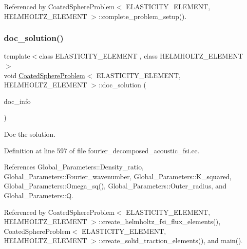 Referenced by Coated\+Sphere\+Problem$<$ E\+L\+A\+S\+T\+I\+C\+I\+T\+Y\+\_\+\+E\+L\+E\+M\+E\+N\+T, H\+E\+L\+M\+H\+O\+L\+T\+Z\+\_\+\+E\+L\+E\+M\+E\+N\+T $>$\+::complete\+\_\+problem\+\_\+setup().

\mbox{\label{classCoatedSphereProblem_aaeade2a110160c002b2b45954a5a0edc}} 
\subsubsection{\texorpdfstring{doc\+\_\+solution()}{doc\_solution()}\hspace{0.1cm}{\footnotesize\ttfamily [1/2]}}
{\footnotesize\ttfamily template$<$class E\+L\+A\+S\+T\+I\+C\+I\+T\+Y\+\_\+\+E\+L\+E\+M\+E\+NT , class H\+E\+L\+M\+H\+O\+L\+T\+Z\+\_\+\+E\+L\+E\+M\+E\+NT $>$ \\
void \hyperlink{classCoatedSphereProblem}{Coated\+Sphere\+Problem}$<$ E\+L\+A\+S\+T\+I\+C\+I\+T\+Y\+\_\+\+E\+L\+E\+M\+E\+NT, H\+E\+L\+M\+H\+O\+L\+T\+Z\+\_\+\+E\+L\+E\+M\+E\+NT $>$\+::doc\+\_\+solution (\begin{DoxyParamCaption}\item[{Doc\+Info \&}]{doc\+\_\+info }\end{DoxyParamCaption})}



Doc the solution. 



Definition at line 597 of file fourier\+\_\+decomposed\+\_\+acoustic\+\_\+fsi.\+cc.



References Global\+\_\+\+Parameters\+::\+Density\+\_\+ratio, Global\+\_\+\+Parameters\+::\+Fourier\+\_\+wavenumber, Global\+\_\+\+Parameters\+::\+K\+\_\+squared, Global\+\_\+\+Parameters\+::\+Omega\+\_\+sq(), Global\+\_\+\+Parameters\+::\+Outer\+\_\+radius, and Global\+\_\+\+Parameters\+::Q.



Referenced by Coated\+Sphere\+Problem$<$ E\+L\+A\+S\+T\+I\+C\+I\+T\+Y\+\_\+\+E\+L\+E\+M\+E\+N\+T, H\+E\+L\+M\+H\+O\+L\+T\+Z\+\_\+\+E\+L\+E\+M\+E\+N\+T $>$\+::create\+\_\+helmholtz\+\_\+fsi\+\_\+flux\+\_\+elements(), Coated\+Sphere\+Problem$<$ E\+L\+A\+S\+T\+I\+C\+I\+T\+Y\+\_\+\+E\+L\+E\+M\+E\+N\+T, H\+E\+L\+M\+H\+O\+L\+T\+Z\+\_\+\+E\+L\+E\+M\+E\+N\+T $>$\+::create\+\_\+solid\+\_\+traction\+\_\+elements(), and main().

